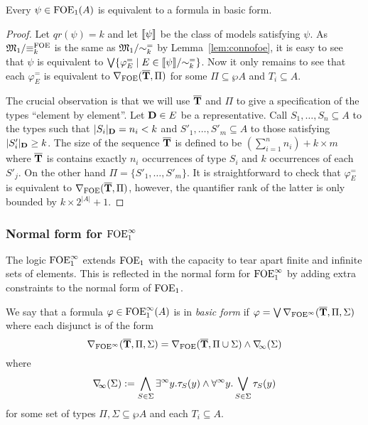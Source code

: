 \begin{theorem}\label{thm:bnfofoe}
Every $\psi \in \mathrm{FOE}_1(A)$ is equivalent to a formula in basic form.
\end{theorem}
\begin{proof}
	Let $qr(\psi) = k$ and let $\llbracket\psi\rrbracket$ be the class of models satisfying $\psi$. As $\mathfrak{M}_1/{\equiv_k^\mathrm{FOE}}$ is the same as $\mathfrak{M}_1/{\sim_k^=}$ by Lemma~\ref{lem:connofoe}, it is easy to see that $\psi$ is equivalent to $\bigvee \{ \varphi^=_E \mid E \in \llbracket\psi\rrbracket/{\sim_k^=} \}$. Now it only remains to see that each $\varphi^=_E$ is equivalent to $\nabla_{\mathrm{FOE}}(\overline{{\mathbf{T}}},\Pi)$ for some $\Pi \subseteq \wp A$ and $T_i \subseteq A$.

	The crucial observation is that we will use $\overline{{\mathbf{T}}}$ and $\Pi$ to give a specification of the types ``element by element''. Let $\mathbf{D} \in E$ be a representative. Call $S_1,\dots,S_n \subseteq A$ to the types such that $|S_i|_{\mathbf{D}} = n_i < k$ and $S'_1,\dots,S'_m \subseteq A$ to those satisfying $|S'_i|_{\mathbf{D}} \geq k$. The size of the sequence $\overline{{\mathbf{T}}}$ is defined to be $(\sum_{i=1}^n n_i) + k\times m$ where $\overline{{\mathbf{T}}}$ is contains exactly $n_i$ occurrences of type $S_i$ and $k$ occurrences of each $S'_j$. On the other hand $\Pi = \{S'_1,\dots,S'_m\}$. It is straightforward to check that $\varphi^=_E$ is equivalent to $\nabla_{\mathrm{FOE}}(\overline{{\mathbf{T}}},\Pi)$, however, the quantifier rank of the latter is only bounded by $k\times 2^{|A|} + 1$.
\end{proof}

\subsubsection{Normal form for $\mathrm{FOE}^{\infty}_1$}

The logic $\mathrm{FOE}^{\infty}_1$ extends $\mathrm{FOE}_1$ with the capacity to tear apart finite and infinite sets of elements. This is reflected in the normal form for $\mathrm{FOE}^{\infty}_1$ by adding extra constraints to the normal form of $\mathrm{FOE}_1$.

\index{$\dbnfinf{\Sigma}$}
\begin{definition}\label{def:basicform_fofoei}
We say that a formula $\varphi \in \mathrm{FOE}^{\infty}_1(A)$ is in \emph{basic form} if $\varphi = \bigvee \nabla_{\mathrm{FOE}^{\infty}}(\overline{{\mathbf{T}}},\Pi,\Sigma)$ where each disjunct is of the form
%
\[
\nabla_{\mathrm{FOE}^{\infty}}(\overline{{\mathbf{T}}},\Pi,\Sigma) = \nabla_{\mathrm{FOE}}(\overline{{\mathbf{T}}},\Pi \cup \Sigma) \land \nabla_{\!\!\infty}(\Sigma)
\]
where
\[
\nabla_{\!\!\infty}(\Sigma) := \bigwedge_{S\in\Sigma} \exists^\infty y.\tau_S(y) \land \forall^\infty y.\bigvee_{S\in\Sigma} \tau_S(y)
\]
%
for some set of types $\Pi,\Sigma \subseteq \wp A$ and each $T_i \subseteq A$.
\end{definition}

